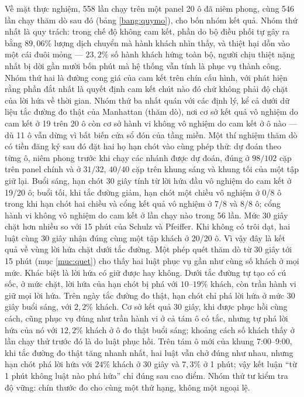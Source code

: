 Về mặt thực nghiệm, 558 lần chạy trên một panel 20 ô đã niêm phong, cùng 546 lần chạy thăm dò sau đó
(bảng \ref{bang:quymo}), cho bốn nhóm kết quả. Nhóm
thứ nhất là quy trách: trong chế độ không cam kết, phần do bộ điều phối tự gây ra bằng
$89{,}06\%$ lượng dịch chuyển mà hành khách nhìn thấy, và thiệt hại dồn vào một cái đuôi mỏng --- $23{,}2\%$ số
hành khách hứng toàn bộ, người chịu thiệt nặng nhất bị dời gần mười bốn phút mà hệ thống vẫn
tính là phục vụ thành công. Nhóm thứ hai là đường cong giá của cam kết trên chín cấu hình, với
phát hiện rằng phần đắt nhất là quyết định cam kết chút nào đó chứ không phải độ chặt của lời
hứa về thời gian. Nhóm thứ ba nhất quán với các định lý, kể cả dưới dữ liệu tắc đường đo thật của
Manhattan (thăm dò), nơi cơ sở kết quả vô nghiệm do cam kết ở 19 trên 20 ô còn cơ sở hành vi không
vô nghiệm do cam kết ở ô nào --- dù 11 ô vẫn dừng vì bất biến cửa sổ đón của tầng miền. Một thí
nghiệm thăm dò có tiền đăng ký sau đó đặt hai họ hạn chót vào cùng phép thử: dự đoán theo từng ô,
niêm phong trước khi chạy các nhánh được dự đoán, đúng ở $98/102$ cặp trên panel chính và ở $31/32$, $40/40$ cặp trên khung
sáng và khung tối của một tập giữ lại. Buổi sáng, hạn chót 30 giây tính từ lời hứa đầu vô nghiệm do
cam kết ở 19/20 ô; buổi tối, khi tắc đường giảm, hạn chót một chiều vô nghiệm ở 0/8 ô trong khi hạn
chót hai chiều và cổng kết quả vô nghiệm ở 7/8 và 8/8 ô; cổng hành vi không vô nghiệm do cam kết ở
lần chạy nào trong 56 lần. Mức 30 giây chặt hơn nhiều so với 15 phút của Schulz và Pfeiffer. Khi không
có trôi dạt, hai luật cùng 30 giây nhận đúng cùng một tập khách ở 20/20 ô. Vì vậy đây là kết quả về
vùng lời hứa chặt dưới tắc đường. Một phép quét thăm dò từ 30 giây tới 15 phút (mục \ref{muc:quet})
cho thấy hai luật phục vụ gần như cùng số khách ở mọi mức. Khác biệt là lời hứa có giữ được hay
không. Dưới tắc đường tự tạo có cú sốc, ở mức chặt, lời hứa của hạn chót bị phá với $10$--$19\%$ khách,
còn trần hành vi giữ mọi lời hứa. Trên ngày tắc đường đo thật, hạn chót chỉ phá lời hứa ở mức 30 giây
buổi sáng, với $2{,}2\%$ khách. Cơ sở kết quả 30 giây, khi được phục hồi cùng cách, cũng phục vụ đúng như trần
hành vi ở cả tám ô có tắc, nhưng tự phá lời hứa của nó với $12{,}2\%$ khách ở ô đo thật buổi sáng; khoảng cách số khách
thấy ở lần chạy thử trước đó là do luật phục hồi. Trên tám ô mới của khung 7:00--9:00, khi tắc đường đo thật tăng nhanh
nhất, hai luật vẫn chở đúng như nhau, nhưng hạn chót phá lời hứa với $24\%$ khách ở 30 giây và $7{,}3\%$ ở 1 phút; vậy
kết luận ``từ 1 phút không luật nào phá hứa'' chỉ đúng sau cao điểm. Nhóm thứ tư kiểm tra độ vững: chín thước đo cho cùng một thứ hạng, không
một ngoại lệ.

